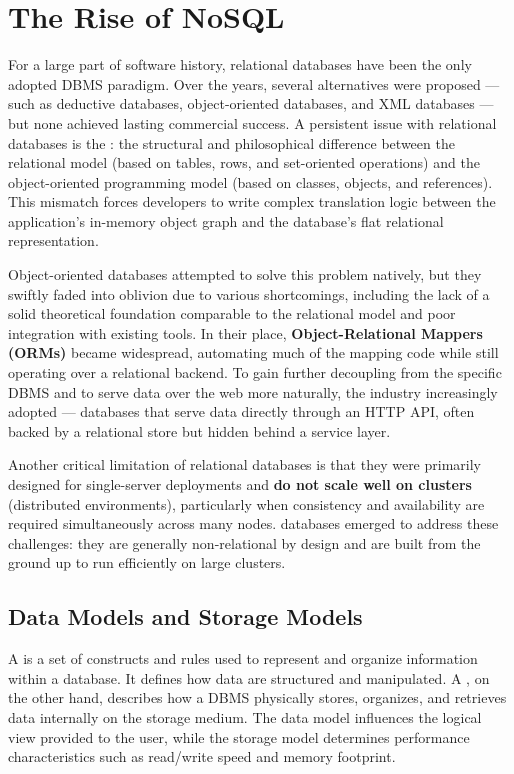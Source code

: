 \chapter{The Rise of NoSQL}
For a large part of software history, relational databases have been the only adopted DBMS paradigm. Over the years, several alternatives were proposed --- such as deductive databases, object-oriented databases, and XML databases --- but none achieved lasting commercial success. A persistent issue with relational databases is the : the structural and philosophical difference between the relational model (based on tables, rows, and set-oriented operations) and the object-oriented programming model (based on classes, objects, and references)\cite{sadalage2012nosql}. This mismatch forces developers to write complex translation logic between the application's in-memory object graph and the database's flat relational representation.

Object-oriented databases attempted to solve this problem natively, but they swiftly faded into oblivion due to various shortcomings, including the lack of a solid theoretical foundation comparable to the relational model and poor integration with existing tools. In their place, \textbf{Object-Relational Mappers (ORMs)} became widespread, automating much of the mapping code while still operating over a relational backend. To gain further decoupling from the specific DBMS and to serve data over the web more naturally, the industry increasingly adopted  --- databases that serve data directly through an HTTP API, often backed by a relational store but hidden behind a service layer.

Another critical limitation of relational databases is that they were primarily designed for single-server deployments and \textbf{do not scale well on clusters} (distributed environments), particularly when consistency and availability are required simultaneously across many nodes\cite{kleppmann2017ddia}.  databases emerged to address these challenges: they are generally non-relational by design and are built from the ground up to run efficiently on large clusters.

\section{Data Models and Storage Models}
A  is a set of constructs and rules used to represent and organize information within a database. It defines how data are structured and manipulated. A , on the other hand, describes how a DBMS physically stores, organizes, and retrieves data internally on the storage medium. The data model influences the logical view provided to the user, while the storage model determines performance characteristics such as read/write speed and memory footprint.

